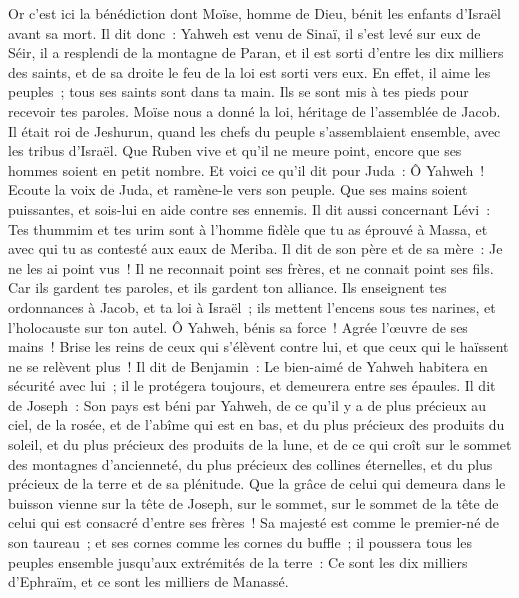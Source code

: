 \begin{multicols}{2}
\VerseOne{}Or c'est ici la bénédiction dont Moïse, homme de Dieu, bénit les enfants d'Israël avant sa mort.
Il dit donc~: Yahweh est venu de Sinaï, il s'est levé sur eux de Séir, il a resplendi de la montagne de Paran, et il est sorti d'entre les dix milliers des saints, et de sa droite le feu de la loi est sorti vers eux.
En effet, il aime les peuples~; tous ses saints sont dans ta main. Ils se sont mis à tes pieds pour recevoir tes paroles.
Moïse nous a donné la loi, héritage de l'assemblée de Jacob.
Il était roi de Jeshurun, quand les chefs du peuple s'assemblaient ensemble, avec les tribus d'Israël.
Que Ruben vive et qu'il ne meure point, encore que ses hommes soient en petit nombre.
Et voici ce qu'il dit pour Juda~: Ô Yahweh~! Ecoute la voix de Juda, et ramène-le vers son peuple. Que ses mains soient puissantes, et sois-lui en aide contre ses ennemis.
Il dit aussi concernant Lévi~: Tes thummim et tes urim sont à l'homme fidèle que tu as éprouvé à Massa, et avec qui tu as contesté aux eaux de Meriba.
Il dit de son père et de sa mère~: Je ne les ai point vus~! Il ne reconnait point ses frères, et ne connait point ses fils. Car ils gardent tes paroles, et ils gardent ton alliance.
Ils enseignent tes ordonnances à Jacob, et ta loi à Israël~; ils mettent l'encens sous tes narines, et l'holocauste sur ton autel.
Ô Yahweh, bénis sa force~! Agrée l'œuvre de ses mains~! Brise les reins de ceux qui s'élèvent contre lui, et que ceux qui le haïssent ne se relèvent plus~!
Il dit de Benjamin~: Le bien-aimé de Yahweh habitera en sécurité avec lui~; il le protégera toujours, et demeurera entre ses épaules.
Il dit de Joseph~: Son pays est béni par Yahweh, de ce qu'il y a de plus précieux au ciel, de la rosée, et de l'abîme qui est en bas,
et du plus précieux des produits du soleil, et du plus précieux des produits de la lune,
et de ce qui croît sur le sommet des montagnes d'ancienneté, du plus précieux des collines éternelles,
et du plus précieux de la terre et de sa plénitude. Que la grâce de celui qui demeura dans le buisson vienne sur la tête de Joseph, sur le sommet, sur le sommet de la tête de celui qui est consacré d'entre ses frères~!
Sa majesté est comme le premier-né de son taureau~; et ses cornes comme les cornes du buffle~; il poussera tous les peuples ensemble jusqu'aux extrémités de la terre~: Ce sont les dix milliers d'Ephraïm, et ce sont les milliers de Manassé.

\end{multicols}
